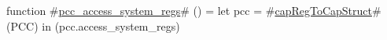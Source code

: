 function #\hyperref[zpcczyaccesszysystemzyregs]{pcc\_access\_system\_regs}# () = 
      let pcc = #\hyperref[zcapRegToCapStruct]{capRegToCapStruct}#(PCC) in
      (pcc.access_system_regs)
